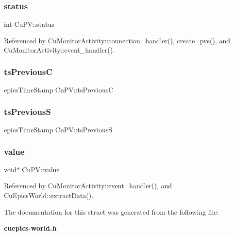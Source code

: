 \mbox{\label{structCuPV_ad55a0bec6ad609731afa94a77c5d5dde}} 
\subsubsection{status}
{\footnotesize\ttfamily int Cu\+P\+V\+::status}



Referenced by Cu\+Monitor\+Activity\+::connection\+\_\+handler(), create\+\_\+pvs(), and Cu\+Monitor\+Activity\+::event\+\_\+handler().

\mbox{\label{structCuPV_a181d02d13acf6b3cbc8165eea36b1d6f}} 
\subsubsection{ts\+PreviousC}
{\footnotesize\ttfamily epics\+Time\+Stamp Cu\+P\+V\+::ts\+PreviousC}

\mbox{\label{structCuPV_a08a6b2e29f73e654d5108891e13225f8}} 
\subsubsection{ts\+PreviousS}
{\footnotesize\ttfamily epics\+Time\+Stamp Cu\+P\+V\+::ts\+PreviousS}

\mbox{\label{structCuPV_a6892830a1d61dcdab3c10d792a49cf6b}} 
\subsubsection{value}
{\footnotesize\ttfamily void$\ast$ Cu\+P\+V\+::value}



Referenced by Cu\+Monitor\+Activity\+::event\+\_\+handler(), and Cu\+Epics\+World\+::extract\+Data().



The documentation for this struct was generated from the following file\+:\begin{DoxyCompactItemize}
\item 
\textbf{ cuepics-\/world.\+h}\end{DoxyCompactItemize}
